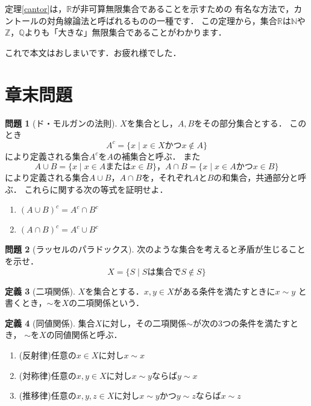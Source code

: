 \documentclass[./main]{subfiles} %
\theoremstyle{definition}
\newtheorem{hamadadefi}{定義}[section]
\newtheorem{hamadaqst}[hamadadefi]{問題}
\begin{document}
定理\ref{cantor}は，$\mathbb{R}$が非可算無限集合であることを示すための
有名な方法で，カントールの対角線論法と呼ばれるものの一種です．
この定理から，集合$\mathbb{R}$は$\mathbb{N}$や
$\mathbb{Z}$，$\mathbb{Q}$よりも「大きな」無限集合であることがわかります．

これで本文はおしまいです．お疲れ様でした．

\section{章末問題}
\begin{hamadaqst}[ド・モルガンの法則]
\label{demorgan}
$X$を集合とし，$A,B$をその部分集合とする．
このとき
\[ A^c=\{x\mid x\in X かつ x\notin A\} \]
により定義される集合$A^c$を$A$の補集合と呼ぶ．
また
\[ A\cup B=\{x\mid x\in A または x\in B\}，A\cap B=\{x\mid x\in A かつ x\in B\} \]
により定義される集合$A\cup B$，$A\cap B$を，それぞれ$A$と$B$の和集合，共通部分と呼ぶ．
これらに関する次の等式を証明せよ．
\begin{enumerate}
\item $(A\cup B)^c=A^c\cap B^c$
\item $(A\cap B)^c=A^c\cup B^c$
\end{enumerate}
\end{hamadaqst}

\begin{hamadaqst}[ラッセルのパラドックス]
\label{russel}
次のような集合を考えると矛盾が生じることを示せ．
\[ X=\{S\mid Sは集合でS\notin S\} \]
\end{hamadaqst}

\begin{hamadadefi}[二項関係]
$X$を集合とする．$x,y\in X$がある条件を満たすときに$x\sim y$
と書くとき，$\sim$を$X$の二項関係という．
\end{hamadadefi}

\begin{hamadadefi}[同値関係]
集合$X$に対し，その二項関係$\sim$が次の3つの条件を満たすとき，
$\sim$を$X$の同値関係と呼ぶ．
\begin{enumerate}
\item(反射律)任意の$x\in X$に対し$x\sim x$
\item(対称律)任意の$x,y\in X$に対し$x\sim y$ならば$y\sim x$
\item(推移律)任意の$x,y,z\in X$に対し$x\sim y$かつ$y\sim z$ならば$x\sim z$
\end{enumerate}
\end{hamadadefi}
\end{document}
